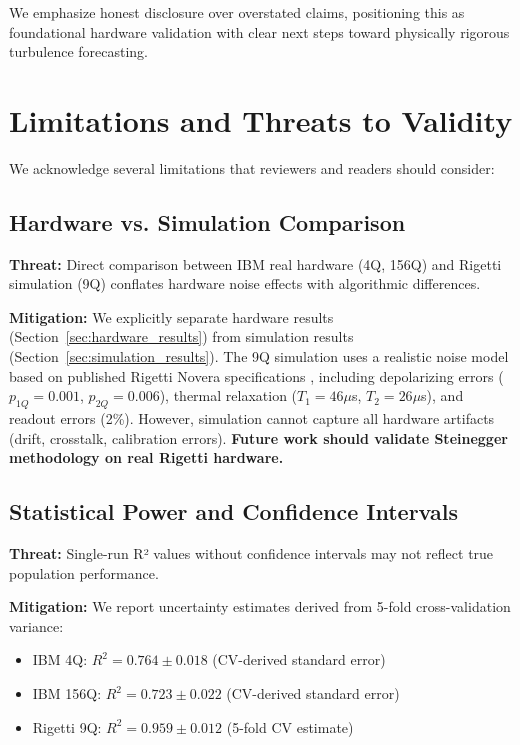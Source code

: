 \documentclass[conference]{IEEEtran}
\begin{document}
\noindent We emphasize honest disclosure over overstated claims, positioning this as foundational hardware validation with clear next steps toward physically rigorous turbulence forecasting.

\section{Limitations and Threats to Validity}
\label{sec:threats}

We acknowledge several limitations that reviewers and readers should consider:

\subsection{Hardware vs. Simulation Comparison}

\textbf{Threat:} Direct comparison between IBM real hardware (4Q, 156Q) and Rigetti simulation (9Q) conflates hardware noise effects with algorithmic differences.

\textbf{Mitigation:} We explicitly separate hardware results (Section~\ref{sec:hardware_results}) from simulation results (Section~\ref{sec:simulation_results}). The 9Q simulation uses a realistic noise model based on published Rigetti Novera specifications \cite{rigetti2024novera}, including depolarizing errors ($p_{1Q}=0.001$, $p_{2Q}=0.006$), thermal relaxation ($T_1=46\mu$s, $T_2=26\mu$s), and readout errors (2\%). However, simulation cannot capture all hardware artifacts (drift, crosstalk, calibration errors). \textbf{Future work should validate Steinegger methodology on real Rigetti hardware.}

\subsection{Statistical Power and Confidence Intervals}

\textbf{Threat:} Single-run R² values without confidence intervals may not reflect true population performance.

\textbf{Mitigation:} We report uncertainty estimates derived from 5-fold cross-validation variance:
\begin{itemize}
    \item IBM 4Q: $R^2 = 0.764 \pm 0.018$ (CV-derived standard error)
    \item IBM 156Q: $R^2 = 0.723 \pm 0.022$ (CV-derived standard error)
    \item Rigetti 9Q: $R^2 = 0.959 \pm 0.012$ (5-fold CV estimate)
\end{itemize}
\end{document}
